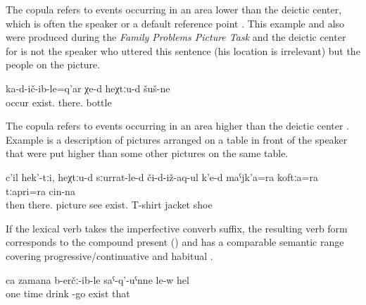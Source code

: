 The copula  refers to events occurring in an area lower than the deictic center, which is often the speaker or a default reference point . This example and also  were produced during the \textit{Family Problems Picture Task} \citep{SanRoqueEtAl2012} and the deictic center for  is not the speaker who uttered this sentence (his location is irrelevant) but the people on the picture. 
%
\begin{exe}
	\ex	\label{ex:There bottles have fallen down periphrastic}
	\gll	ka-d-ič-ib-le=q'ar	χe-d	heχtːu-d	šuš-ne\\
		occur	exist.	there.	bottle\\
	\glt	{}
\end{exe}

The copula  refers to events occurring in an area higher than the deictic center . Example  is a description of pictures arranged on a table in front of the speaker that were put higher than some other pictures on the same table.  

\begin{exe}
	\ex	\label{ex:Then there one the picture it shows there are his T-shirt, jacket, and shoes.}
	\gll	c'il	hek'-tːi,	heχtːu-d	sːurrat-le-d	či-d-iž-aq-ul	k'e-d	maˁjk'a=ra	koftːa=ra		tːapri=ra	cin-na\\
		then		there.	picture	see	exist.	T-shirt\tsc{=add}	jacket		shoe	\\
	\glt	{}
\end{exe}

If the lexical verb takes the imperfective converb suffix, the resulting verb form corresponds to the compound present () and has a comparable semantic range covering progressive\slash continuative  and habitual .
%
\begin{exe}
	\ex	\label{ex:One time he comes home drunk}
	\gll	ca	zamana	b-erčː-ib-le	saˁ-q'-uˁnne	le-w	hel\\
		one	time	drink	-go	exist	that\\
	\glt	{}
\end{exe}



